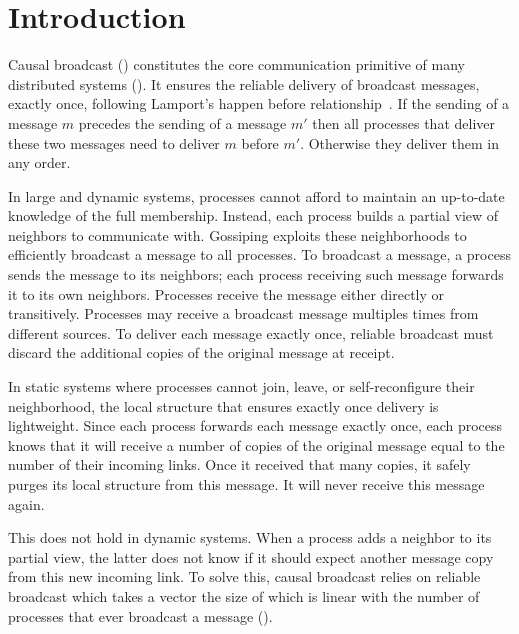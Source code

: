  
\section{Introduction}

Causal broadcast (\REF) constitutes the core communication primitive of many
distributed systems (\REF). It ensures the reliable delivery of broadcast
messages, exactly once, following Lamport's happen before
relationship~\cite{lamport1978time}. If the sending of a message $m$ precedes
the sending of a message $m'$ then all processes that deliver these two messages
need to deliver $m$ before $m'$. Otherwise they deliver them in any order.

In large and dynamic systems, processes cannot afford to maintain an up-to-date
knowledge of the full membership. Instead, each process builds a partial view of
neighbors to communicate with. Gossiping exploits these neighborhoods to
efficiently broadcast a message to all processes. To broadcast a message, a
process sends the message to its neighbors; each process receiving such message
forwards it to its own neighbors. Processes receive the message either directly
or transitively. Processes may receive a broadcast message multiples times from
different sources.  To deliver each message exactly once, reliable broadcast
must discard the additional copies of the original message at receipt. 

In static systems where processes cannot join, leave, or self-reconfigure their
neighborhood, the local structure that ensures exactly once delivery is
lightweight.  Since each process forwards each message exactly once, each
process knows that it will receive a number of copies of the original message
equal to the number of their incoming links. Once it received that many copies,
it safely purges its local structure from this message. It will never receive
this message again.

This does not hold in dynamic systems. When a process adds a neighbor to its
partial view, the latter does not know if it should expect another message copy 
from this new incoming link.   To solve this,
causal broadcast relies on reliable broadcast which takes a vector the size of
which is linear with the number of processes that ever broadcast a message
(\REF).


